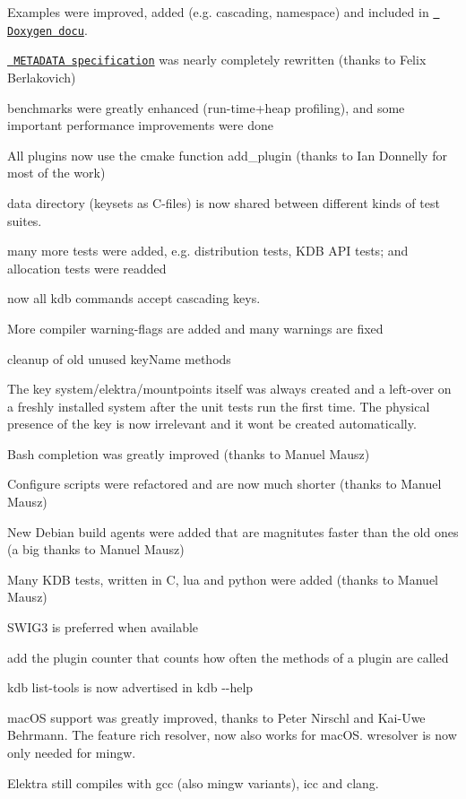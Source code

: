 \begin{DoxyItemize}
\item Examples were improved, added (e.\+g. cascading, namespace) and included in \href{https://doc.libelektra.org/api/0.8.11/html}{\texttt{ Doxygen docu}}.
\item \href{https://github.com/ElektraInitiative/libelektra/blob/master/doc/METADATA.ini}{\texttt{ M\+E\+T\+A\+D\+A\+TA specification}} was nearly completely rewritten (thanks to Felix Berlakovich)
\item benchmarks were greatly enhanced (run-\/time+heap profiling), and some important performance improvements were done
\item All plugins now use the cmake function {\ttfamily add\+\_\+plugin} (thanks to Ian Donnelly for most of the work)
\item data directory (keysets as C-\/files) is now shared between different kinds of test suites.
\item many more tests were added, e.\+g. distribution tests, K\+DB A\+PI tests; and allocation tests were readded
\item now all kdb commands accept cascading keys.
\item More compiler warning-\/flags are added and many warnings are fixed
\item cleanup of old unused {\ttfamily key\+Name} methods
\item The key {\ttfamily system/elektra/mountpoints} itself was always created and a left-\/over on a freshly installed system after the unit tests run the first time. The physical presence of the key is now irrelevant and it won\textquotesingle{}t be created automatically.
\item Bash completion was greatly improved (thanks to Manuel Mausz)
\item Configure scripts were refactored and are now much shorter (thanks to Manuel Mausz)
\item New Debian build agents were added that are magnitutes faster than the old ones (a big thanks to Manuel Mausz)
\item Many K\+DB tests, written in C, lua and python were added (thanks to Manuel Mausz)
\item S\+W\+I\+G3 is preferred when available
\item add the plugin counter that counts how often the methods of a plugin are called
\item {\ttfamily kdb list-\/tools} is now advertised in {\ttfamily kdb -\/-\/help}
\item mac\+OS support was greatly improved, thanks to Peter Nirschl and Kai-\/\+Uwe Behrmann. The feature rich resolver, now also works for mac\+OS. wresolver is now only needed for mingw.
\item Elektra still compiles with gcc (also mingw variants), icc and clang.
\end{DoxyItemize}

